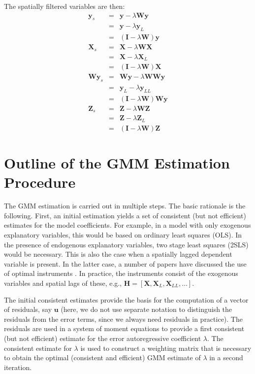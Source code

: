 \documentclass{article}
\begin{document}
The spatially filtered variables are then:
\begin{eqnarray*}
\mathbf{y}_s &=& \mathbf{y} - \lambda \mathbf{Wy}\\
                    &=& \mathbf{y} - \lambda \mathbf{y}_L\\
 &=& (\mathbf{I} - \lambda \mathbf{W}) \mathbf{y}\\
\mathbf{X}_s &=& \mathbf{X} - \lambda \mathbf{WX}\\
                    &=& \mathbf{X} - \lambda \mathbf{X}_L\\
 &=& (\mathbf{I} - \lambda \mathbf{W}) \mathbf{X}\\
 \mathbf{Wy}_s &=& \mathbf{Wy} - \lambda \mathbf{WWy}\\
                     &=& \mathbf{y}_L - \lambda \mathbf{y}_{LL}\\
 &=& (\mathbf{I} - \lambda \mathbf{W}) \mathbf{Wy}\\
\mathbf{Z}_s &=& \mathbf{Z} - \lambda \mathbf{WZ}\\
                    &=& \mathbf{Z} - \lambda \mathbf{Z}_L\\
 &=& (\mathbf{I} - \lambda \mathbf{W}) \mathbf{Z}
\end{eqnarray*}


\section{Outline of the GMM Estimation Procedure}
The GMM estimation is carried out in multiple steps. The basic rationale is the
following. First, an initial estimation yields a set of consistent (but not efficient) estimates
for the model coefficients. For example, in a model with only exogenous explanatory
variables, this would be based on ordinary least squares (OLS). In the presence of
endogenous explanatory variables, two stage least squares (2SLS) would be necessary.
This is also the case when a spatially lagged dependent variable is present. In the latter
case, a number of papers have discussed the use of optimal instruments
\cite[e.g.,][]{Lee:03,Dasetal:03,Kelejianetal:04,Lee:07}. In practice, the instruments
consist of the exogenous variables and spatial lags of these, e.g., 
$\mathbf{H} = [ \mathbf{X}, \mathbf{X}_L, \mathbf{X}_{LL}, \dots ]$.

The initial consistent estimates provide the basis for the computation of a vector
of residuals, say $\mathbf{u}$ (here, we do not use separate notation to distinguish the
residuals from the error terms, since we always need residuals in practice). The residuals are 
used in a system of moment equations to provide a first consistent (but not efficient) estimate
for the error autoregressive coefficient $\lambda$. The consistent estimate for $\lambda$ is used
to construct a weighting matrix that is necessary to obtain the optimal (consistent and efficient) GMM
estimate of $\lambda$ in a second iteration.
\end{document}
